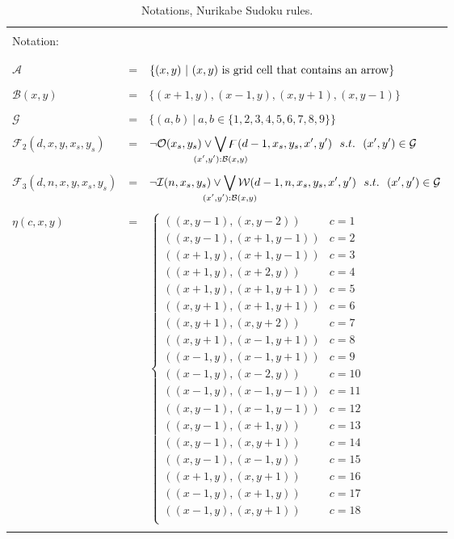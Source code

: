 \begin{table}
    \centering
    \begin{tabular*}{\textwidth}{l c l}
    \hline
    \\
    \multicolumn{3}{l}{Notation:}\\
    \\
    \hline
    \\
    $\mathcal{A}$           &= & $\{(x,y)~|~(x,y)~\textnormal{is grid cell that contains an arrow}\}$\\
    \\
    $\mathcal{B}(x,y)$      &= & $\{(x+1,y), (x-1,y), (x,y+1), (x,y-1)\}$\\
    \\
    $\mathcal{G}$           &= & $\{(a,b)~|~a,b\in \{1,2,3,4,5,6,7,8,9\}\}$\\
    \\
    $\mathcal{F}_2(d,x,y,x_s,y_s)$          &= & $\displaystyle \neg \ocean(x_s,y_s) \lor \bigvee_{\mathclap{(x',y'):\mathcal{B}(x,y)}} \flood(d-1,x_s,y_s,x',y')~~s.t.~~(x',y') \in \mathcal{G}$\\
        \\
    $\mathcal{F}_3(d,n,x,y,x_s,y_s)$        &= & $\displaystyle \neg \island(n,x_s,y_s) \lor \bigvee_{\mathclap{(x',y'):\mathcal{B}(x,y)}} \walk(d-1,n,x_s,y_s,x',y')~~s.t.~~(x',y') \in \mathcal{G}$\\
    \\
    $\eta(c,x,y) $   &= &$\begin{cases}
    ((x,y-1),(x,y-2))       & c = 1 \\
    ((x,y-1),(x+1,y-1))     & c = 2 \\
    ((x+1,y),(x+1,y-1))     & c = 3 \\
    ((x+1,y),(x+2,y))       & c = 4 \\
    ((x+1,y),(x+1,y+1))     & c = 5 \\
    ((x,y+1),(x+1,y+1))     & c = 6 \\
    ((x,y+1),(x,y+2))       & c = 7 \\
    ((x,y+1),(x-1,y+1))     & c = 8 \\
    ((x-1,y),(x-1,y+1))     & c = 9 \\
    ((x-1,y),(x-2,y))       & c = 10 \\
    ((x-1,y),(x-1,y-1))     & c = 11 \\
    ((x,y-1),(x-1,y-1))     & c = 12 \\
    ((x,y-1),(x+1,y))       & c = 13 \\
    ((x,y-1),(x,y+1))       & c = 14 \\
    ((x,y-1),(x-1,y))       & c = 15 \\
    ((x+1,y),(x,y+1))       & c = 16 \\
    ((x-1,y),(x+1,y))       & c = 17 \\
    ((x-1,y),(x,y+1))       & c = 18 \\
    \end{cases}$\\
    \\
    \hline
    \end{tabular*}
    \caption{Notations, Nurikabe Sudoku rules.}
    \label{notation:NurikabeSudoku}
\end{table}

